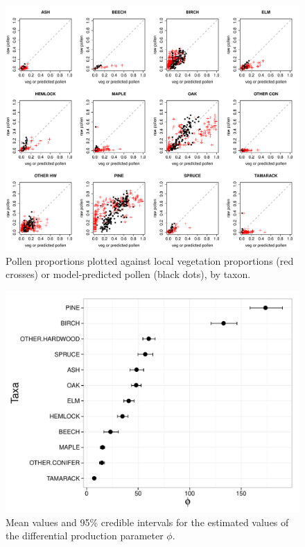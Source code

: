 \begin{figure}
\centering
\includegraphics[width=7in]{figures/pollen_preds.pdf}
\caption{Pollen proportions plotted against local vegetation proportions (red crosses) or model-predicted pollen (black dots), by taxon.}
\label{fig:preds}
\end{figure}

\begin{figure}
\centering
\includegraphics[width=7in]{figures/phi.pdf}
\caption{Mean values and 95\% credible intervals for the estimated values of the differential production parameter $\phi$.}
\label{fig:phi}
\end{figure}


